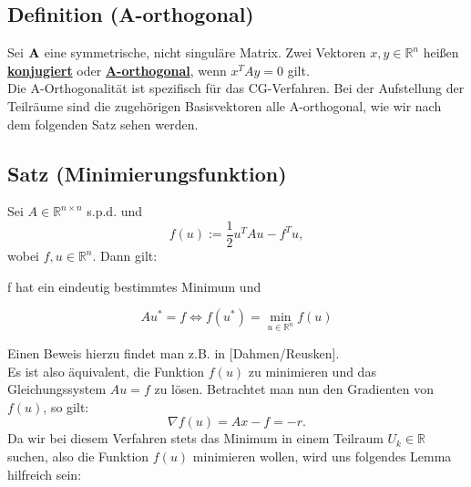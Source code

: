 \subsection{Definition (A-orthogonal)}\label{ss.A-orthogonal}
Sei ${\textbf{A}}$ eine symmetrische, nicht singuläre Matrix. Zwei Vektoren $x,y \in \mathbb{R}^{n}$ heißen \underline{\textbf{konjugiert}} oder \underline{\textbf{A-orthogonal}}, wenn $x^{T}Ay = 0$ gilt.\\

Die A-Orthogonalität ist spezifisch für das CG-Verfahren. Bei der Aufstellung der Teilräume sind die zugehörigen Basisvektoren alle A-orthogonal, wie wir nach dem folgenden Satz sehen werden.

\subsection{Satz (Minimierungsfunktion)}
Sei $A\in\mathbb{R}^{n \times n}$ s.p.d. und
\begin{equation}
f(u) := \frac {1} {2} u^{T}Au - f^{T}u,
\end{equation}
wobei $f,u \in \mathbb{R}^{n}$. Dann gilt:
\begin{center}
f hat ein eindeutig bestimmtes Minimum und
\end{center}
\begin{equation}
Au^{*} = f \Longleftrightarrow f(u^{*}) = \underset{u\in\mathbb{R}^{n}}{\min} f(u)
\end{equation}

Einen Beweis hierzu findet man z.B. in [Dahmen/Reusken].\\
Es ist also äquivalent, die Funktion $f(u)$ zu minimieren und das Gleichungssystem $Au = f$ zu lösen. Betrachtet man nun den Gradienten von $f(u)$, so gilt:
\begin{equation}
\nabla f(u) = Ax - f = -r.
\end{equation}
Da wir bei diesem Verfahren stets das Minimum in einem Teilraum $U_{k} \in \mathbb{R}$ suchen, also die Funktion $f(u)$ minimieren wollen, wird uns folgendes Lemma hilfreich sein:

